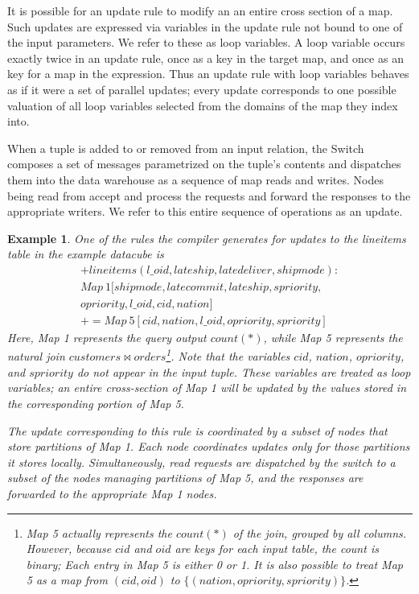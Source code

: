 \documentclass{sig-alternate}
\newtheorem{example}{Example}
\begin{document}
It is possible for an update rule to modify an an entire cross section of a map.  Such updates are expressed via variables in the update rule not bound to one of the input parameters.  We refer to these as loop variables.  A loop variable occurs exactly twice in an update rule, once as a key in the target map, and once as an key for a map in the expression.  Thus an update rule with loop variables behaves as if it were a set of parallel updates; every update corresponds to one possible valuation of all loop variables selected from the domains of the map they index into.

When a tuple is added to or removed from an input relation, the Switch composes a set of messages parametrized on the tuple's contents and dispatches them into the data warehouse as a sequence of map reads and writes.  Nodes being read from accept and process the requests and forward the responses to the appropriate writers.  We refer to this entire sequence of operations as an update.

\begin{example}
One of the rules the compiler generates for updates to the lineitems table in the example datacube is
{\footnotesize
\begin{eqnarray*}
+lineitems(l\_oid,lateship,latedeliver,shipmode) : \\
Map\ 1[shipmode,latecommit,lateship,spriority,\\ opriority,l\_oid,cid,nation] \\
 += Map\ 5[cid,nation,l\_oid,opriority,spriority]
\end{eqnarray*}}
\noindent Here, Map 1 represents the query output $count(*)$, while Map 5 represents the natural join $customers \bowtie orders$\footnote{Map 5 actually represents the $count(*)$ of the join, grouped by all columns.  However, because $cid$ and $oid$ are keys for each input table, the count is binary; Each entry in Map 5 is either 0 or 1.  It is also possible to treat Map 5 as a map from $(cid,oid)$ to $\{(nation, opriority, spriority)\}$. }.  Note that the variables $cid$, $nation$, $opriority$, and $spriority$ do not appear in the input tuple.  These variables are treated as loop variables; an entire cross-section of Map 1 will be updated by the values stored in the corresponding portion of Map 5.  

The update corresponding to this rule is coordinated by a subset of nodes that store partitions of Map 1.  Each node coordinates updates only for those partitions it stores locally.  Simultaneously, read requests are dispatched by the switch to a subset of the nodes managing partitions of Map 5, and the responses are forwarded to the appropriate Map 1 nodes.  
\end{example}
\end{document}
